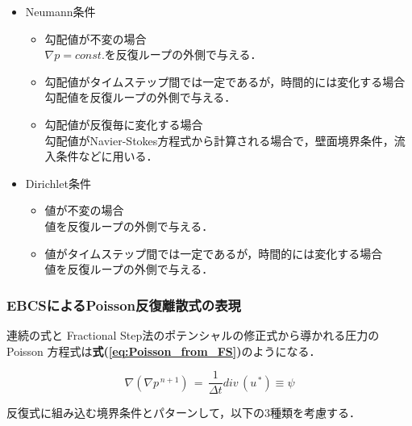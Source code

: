 \begin{itemize}
\item \hypertarget{tgt:EBCS poisson BC}{Neumann条件}
\begin{itemize}
\item 勾配値が不変の場合\\
$\nabla p = const.$を反復ループの外側で与える．\vspace{1mm}
\item 勾配値がタイムステップ間では一定であるが，時間的には変化する場合\\
勾配値を反復ループの外側で与える．\vspace{1mm}
\item 勾配値が反復毎に変化する場合\\
勾配値がNavier-Stokes方程式から計算される場合で，壁面境界条件，流入条件などに用いる．\vspace{1mm}
\end{itemize}

\item Dirichlet条件
\begin{itemize}
\item 値が不変の場合\\
値を反復ループの外側で与える．\vspace{1mm}
\item 値がタイムステップ間では一定であるが，時間的には変化する場合\\
値を反復ループの外側で与える．\vspace{1mm}
\end{itemize}
\end{itemize}



%
\subsubsection{EBCSによるPoisson反復離散式の表現}
連続の式と Fractional Step法のポテンシャルの修正式から導かれる圧力の Poisson 方程式は\textbf{式(\ref{eq:Poisson_from_FS})}のようになる．

\begin{equation}
\nabla \left( \nabla p^{\,n+1} \right) \,=\, \frac{1}{\Delta t} div\, (u^{\,*}) \equiv \psi
\label{eq:Poisson_from_FS}
\end{equation}

反復式に組み込む境界条件とパターンして，以下の3種類を考慮する．

